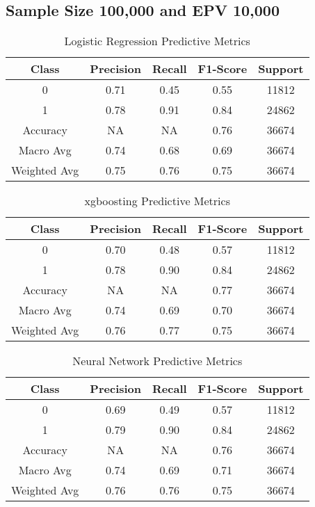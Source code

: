 \documentclass[
  man]{apa7}
\begin{document}
\hypertarget{sample-size-100000-and-epv-10000}{%
\subsection{Sample Size 100,000 and EPV 10,000}\label{sample-size-100000-and-epv-10000}}

\begin{table}
\centering
\caption{\label{tab:logitable100k}Logistic Regression Predictive Metrics}
\centering
\fontsize{12}{14}\selectfont
\begin{tabular}[t]{c|c|c|c|c}
\hline
Class & Precision & Recall & F1-Score & Support\\
\hline
0 & 0.71 & 0.45 & 0.55 & 11812\\
\hline
1 & 0.78 & 0.91 & 0.84 & 24862\\
\hline
Accuracy & NA & NA & 0.76 & 36674\\
\hline
Macro Avg & 0.74 & 0.68 & 0.69 & 36674\\
\hline
Weighted Avg & 0.75 & 0.76 & 0.75 & 36674\\
\hline
\end{tabular}
\end{table}

\begin{table}
\centering
\caption{\label{tab:xgbtable100k}xgboosting Predictive Metrics}
\centering
\fontsize{12}{14}\selectfont
\begin{tabular}[t]{c|c|c|c|c}
\hline
Class & Precision & Recall & F1-Score & Support\\
\hline
0 & 0.70 & 0.48 & 0.57 & 11812\\
\hline
1 & 0.78 & 0.90 & 0.84 & 24862\\
\hline
Accuracy & NA & NA & 0.77 & 36674\\
\hline
Macro Avg & 0.74 & 0.69 & 0.70 & 36674\\
\hline
Weighted Avg & 0.76 & 0.77 & 0.75 & 36674\\
\hline
\end{tabular}
\end{table}

\begin{table}
\centering
\caption{\label{tab:nn100k}Neural Network Predictive Metrics}
\centering
\fontsize{12}{14}\selectfont
\begin{tabular}[t]{c|c|c|c|c}
\hline
Class & Precision & Recall & F1-Score & Support\\
\hline
0 & 0.69 & 0.49 & 0.57 & 11812\\
\hline
1 & 0.79 & 0.90 & 0.84 & 24862\\
\hline
Accuracy & NA & NA & 0.76 & 36674\\
\hline
Macro Avg & 0.74 & 0.69 & 0.71 & 36674\\
\hline
Weighted Avg & 0.76 & 0.76 & 0.75 & 36674\\
\hline
\end{tabular}
\end{table}
\end{document}
